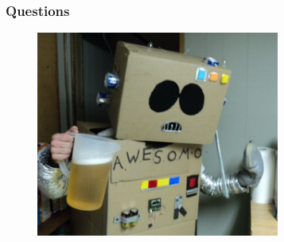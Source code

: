 \documentclass[xcolor={fixpdftex,hyperref,x11names},10pt,pdftex,hyperref={pdftex}]{beamer}
\begin{document}
\begin{frame}
  \frametitle{Questions}
  \begin{figure}[h]
      \includegraphics[width=80mm]{figs/funny-drunk-guy-robot.jpg}
  \end{figure}
\end{frame}


\end{document}
